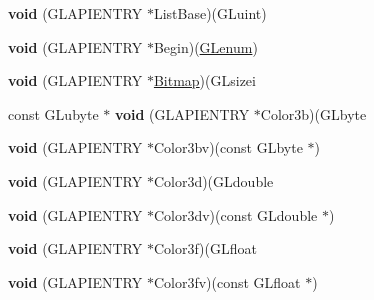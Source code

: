 \begin{DoxyCompactItemize}
{\bfseries void} (G\+L\+A\+P\+I\+E\+N\+T\+RY $\ast$List\+Base)(G\+Luint)
\item 
\mbox{\label{struct_____g_ldispatch_table_rec_ae28eb838de284fc8cb3824b4f06e4f2b}} 
{\bfseries void} (G\+L\+A\+P\+I\+E\+N\+T\+RY $\ast$Begin)(\hyperlink{interfacevoid}{G\+Lenum})
\item 
\mbox{\label{struct_____g_ldispatch_table_rec_acd55f4ad492dd6779071928572d1e1f3}} 
{\bfseries void} (G\+L\+A\+P\+I\+E\+N\+T\+RY $\ast$\hyperlink{class_bitmap}{Bitmap})(G\+Lsizei
\item 
\mbox{\label{struct_____g_ldispatch_table_rec_acebf2600f8566c0c92200788ec538ed4}} 
const G\+Lubyte $\ast$ {\bfseries void} (G\+L\+A\+P\+I\+E\+N\+T\+RY $\ast$Color3b)(G\+Lbyte
\item 
\mbox{\label{struct_____g_ldispatch_table_rec_a6219aecaad9c1d4264a2436032256cdd}} 
{\bfseries void} (G\+L\+A\+P\+I\+E\+N\+T\+RY $\ast$Color3bv)(const G\+Lbyte $\ast$)
\item 
\mbox{\label{struct_____g_ldispatch_table_rec_aaa3555c0fb73dbe7f568f468924b8fbe}} 
{\bfseries void} (G\+L\+A\+P\+I\+E\+N\+T\+RY $\ast$Color3d)(G\+Ldouble
\item 
\mbox{\label{struct_____g_ldispatch_table_rec_a88a4b0a9b04bc8e6c472235d660e64f2}} 
{\bfseries void} (G\+L\+A\+P\+I\+E\+N\+T\+RY $\ast$Color3dv)(const G\+Ldouble $\ast$)
\item 
\mbox{\label{struct_____g_ldispatch_table_rec_a3ae72d1463590987266ccb11a6f9171f}} 
{\bfseries void} (G\+L\+A\+P\+I\+E\+N\+T\+RY $\ast$Color3f)(G\+Lfloat
\item 
\mbox{\label{struct_____g_ldispatch_table_rec_afe695493aaf9a5f3a3597a993eeac127}} 
{\bfseries void} (G\+L\+A\+P\+I\+E\+N\+T\+RY $\ast$Color3fv)(const G\+Lfloat $\ast$)
\item 
\mbox{\label{struct_____g_ldispatch_table_rec_a57aef58259d45fa93e30cc07c523dfaa}} 

\end{DoxyCompactItemize}
